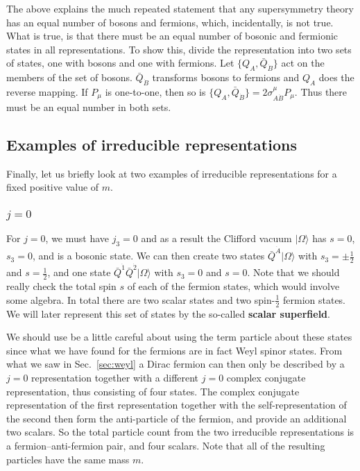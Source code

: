 \documentclass[notes.tex]{subfiles}
\begin{document}
The above explains the much repeated statement that any supersymmetry theory has an equal number of bosons and fermions, which, incidentally, is not true. What is true, is that there must be an equal number of bosonic and fermionic states in all representations.
To show this, divide the representation into two sets of states, one with bosons and one with fermions. Let $\{Q_A, \bar{Q}_{\dot{B}}\}$ act on the members of the set of bosons. $\bar{Q}_{\dot{B}}$ transforms bosons to fermions and $Q_A$ does the reverse mapping. If $P_\mu$ is one-to-one, then so is $\{Q_A, \bar{Q}_{\dot{B}}\} = 2\sigma^\mu_{A\dot{B}}P_\mu$. Thus there must be an equal number in both sets.

\subsection{Examples of irreducible representations}
\label{sec:SP_irreps}
Finally, let us briefly look at two examples of irreducible representations for a fixed positive value of $m$.

\subsubsection{$j=0$}
For $j=0$, we must have $j_3=0$ and as a result the Clifford vacuum $|\Omega\rangle$ has $s=0$, $s_3=0$, and is a bosonic state. We can then create two states $\bar{Q}^{\dot{A}}|\Omega\rangle$ with $s_3 = \pm\frac{1}{2}$ and $s = \frac{1}{2}$,  and one state $\bar{Q}^{\dot{1}}\bar{Q}^{\dot{2}}|\Omega\rangle$ with $s_3 = 0$ and $s = 0$. Note that we should really check the total spin $s$ of each of the fermion states, which would involve some algebra. In total there are two scalar states and two spin-$\frac{1}{2}$ fermion states. We will later represent this set of states by the so-called {\bf scalar superfield}. 

We should use be a little careful about using the term particle about these states since what we have found for the fermions are in fact Weyl spinor states. From what we saw in Sec.~\ref{sec:weyl} a Dirac fermion can then only be described by a $j=0$ representation together with a different $j=0$ complex conjugate representation, thus consisting of four states.
The complex conjugate representation of the first representation together with the self-representation of the second then form the anti-particle of the fermion, and provide an additional two scalars. So the total particle count from the two irreducible representations is a fermion--anti-fermion pair, and four scalars. Note that all of the resulting particles have the same mass $m$.
\end{document}
